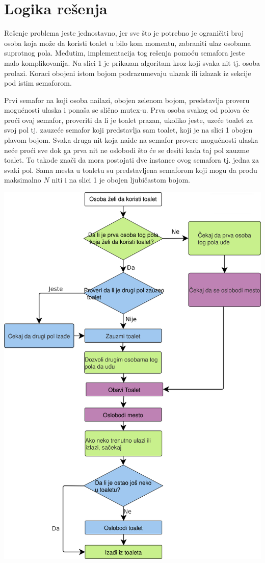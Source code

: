 \documentclass[11pt]{article}
\begin{document}
	\section{Logika rešenja}
	\par Rešenje problema jeste jednostavno, jer sve što je potrebno je
	ograničiti broj osoba koja može da koristi toalet u bilo kom momentu,
	zabraniti ulaz osobama suprotnog pola.
	Međutim, implementacija tog rešenja pomoću semafora jeste malo
	komplikovanija.
	Na slici 1 je prikazan algoritam kroz koji svaka nit tj. osoba
	prolazi.
	Koraci obojeni istom bojom podrazumevaju ulazak ili izlazak iz sekcije
	pod istim semaforom.
	\par Prvi semafor na koji osoba nailazi, obojen zelenom bojom, predstavlja
	proveru mogućnosti ulaska i ponaša se slično mutex-u.
	Prva osoba svakog od polova će proći ovaj semafor, proveriti da li je
	toalet prazan, ukoliko jeste, uzeće toalet za svoj pol tj. zauzeće semafor
	koji predstavlja sam toalet, koji je na slici 1 obojen plavom bojom. 
	Svaka druga nit koja naiđe na semafor provere mogućnosti ulaska neće proći
	sve dok ga prva nit ne oslobodi što će se desiti kada taj pol zauzme
	toalet.
	To takođe znači da mora postojati dve instance ovog semafora tj. jedna za
	svaki pol.
	Sama mesta u toaletu su predstavljena semaforom koji mogu da prođu
	maksimalno $N$ niti i na slici 1 je obojen ljubičastom bojom.
	\begin{center}
	\includegraphics[scale=0.4]{figs/Algoritam-flowchart.png}
	\end{center}
	\newpage
\end{document}
